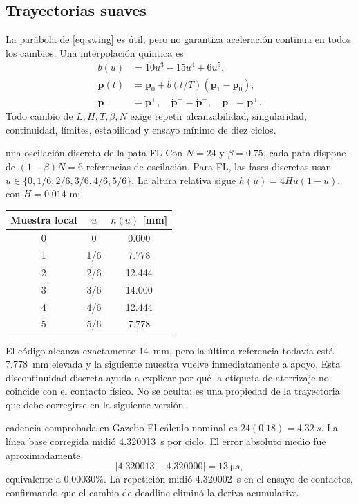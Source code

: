 \documentclass[11pt,letterpaper]{article}
\newcommand{\vect}[1]{\bm{#1}}
\begin{document}
\subsection{Trayectorias suaves}
La parábola de \cref{eq:swing} es útil, pero no garantiza aceleración continua
en todos los cambios. Una interpolación quíntica es
\begin{align}
 b(u)&=10u^3-15u^4+6u^5,\\
 \vect p(t)&=\vect p_0+b(t/T)(\vect p_1-\vect p_0),\label{eq:quintic}\\
 \vect p^-&=\vect p^+,\quad\dot{\vect p}^-=\dot{\vect p}^+,\quad
 \ddot{\vect p}^-=\ddot{\vect p}^+.
\end{align}
Todo cambio de $L,H,T,\beta,N$ exige repetir alcanzabilidad, singularidad,
continuidad, límites, estabilidad y ensayo mínimo de diez ciclos.

\begin{workedexample}{una oscilación discreta de la pata FL}
Con $N=24$ y $\beta=0.75$, cada pata dispone de
$(1-\beta)N=6$ referencias de oscilación. Para FL, las fases discretas usan
$u\in\{0,1/6,2/6,3/6,4/6,5/6\}$. La altura relativa sigue
$h(u)=4Hu(1-u)$, con $H=0.014$ m:
\begin{center}
\begin{tabular}{c@{\qquad}c@{\qquad}c}
\toprule Muestra local&$u$&$h(u)$ [mm]\\\midrule
0&0&0.000\\1&1/6&7.778\\2&2/6&12.444\\
3&3/6&14.000\\4&4/6&12.444\\5&5/6&7.778\\\bottomrule
\end{tabular}
\end{center}
El código alcanza exactamente \SI{14}{mm}, pero la última referencia todavía
está \SI{7.778}{mm} elevada y la siguiente muestra vuelve inmediatamente a
apoyo. Esta discontinuidad discreta ayuda a explicar por qué la etiqueta de
aterrizaje no coincide con el contacto físico. No se oculta: es una propiedad
de la trayectoria que debe corregirse en la siguiente versión.
\end{workedexample}

\begin{projectresult}{cadencia comprobada en Gazebo}
El cálculo nominal es $24(0.18)=\SI{4.32}{s}$. La línea base corregida midió
\SI{4.320013}{s} por ciclo. El error absoluto medio fue aproximadamente
\[
 |4.320013-4.320000|=\SI{13}{\micro s},
\]
equivalente a $0.00030\%$. La repetición midió \SI{4.320002}{s} en el ensayo de
contactos, confirmando que el cambio de deadline eliminó la deriva acumulativa.
\end{projectresult}
\end{document}
